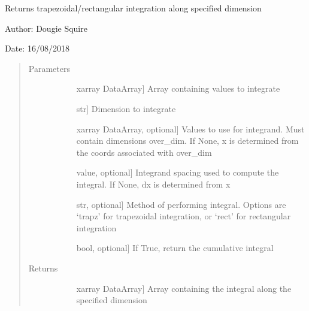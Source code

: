 \documentclass[letterpaper,10pt,english]{sphinxmanual}
\begin{document}
\begin{fulllineitems}
\label{\detokenize{utils_doc:utils.integrate}}
Returns trapezoidal/rectangular integration along specified dimension

\begin{DUlineblock}{0em}
\item[] Author: Dougie Squire
\item[] Date: 16/08/2018
\end{DUlineblock}
\begin{quote}\begin{description}
\item[{Parameters}] \leavevmode\begin{description}
\item[{}] \leavevmode{[}xarray DataArray{]}
Array containing values to integrate

\item[{}] \leavevmode{[}str{]}
Dimension to integrate

\item[{}] \leavevmode{[}xarray DataArray, optional{]}
Values to use for integrand. Must contain dimensions over\_dim. If None, x is determined                    from the coords associated with over\_dim

\item[{}] \leavevmode{[}value, optional{]}
Integrand spacing used to compute the integral. If None, dx is determined from x

\item[{}] \leavevmode{[}str, optional{]}
Method of performing integral. Options are ‘trapz’ for trapezoidal integration, or ‘rect’                    for rectangular integration

\item[{}] \leavevmode{[}bool, optional{]}
If True, return the cumulative integral

\end{description}

\item[{Returns}] \leavevmode\begin{description}
\item[{}] \leavevmode{[}xarray DataArray{]}
Array containing the integral along the specified dimension


\end{description}
\end{description}
\end{quote}
\end{fulllineitems}
\end{document}

